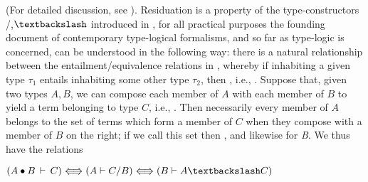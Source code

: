 \documentclass[output=paper,colorlinks,citecolor=brown]{langscibook}
\begin{document}
\begin{exe}
 \ex\label{residuation}
  \sem{ (\psi  \ensuremath{\vdash\xspace } \psi\supset\varrho)\Lleftarrow\!\Rrightarrow (\psi,\phi  \ensuremath{\vdash\xspace } \varrho)\Lleftarrow\!\Rrightarrow (\phi  \ensuremath{\vdash\xspace } \psi\supset\varrho) }
\end{exe}
(For detailed discussion, see \citealt{sep-logic-substructural}). Residuation
is a property of the type-constructors /,$\bsl$ introduced in
\citet{lambek58}, for all practical purposes the founding document of
contemporary type-logical formalisms, and so far as type-logic is
concerned, can be understood in the following way: there is a natural
relationship between the entailment/equivalence relations in
, whereby if inhabiting a given type $\tau_1$ entails
inhabiting some other type $\tau_2$, then \sem{ \tau_1  \ensuremath{\vdash\xspace } \tau_2 },
i.e., \sem{   \ensuremath{\vdash\xspace } \tau_1 \ensuremath{ \rightarrow } \tau_2 }. Suppose that, given two types $A,B$,
we can compose each member of $A$ with each member of $B$ to yield a
term belonging to type $C$, i.e., \sem{ A\bullet B\,  \ensuremath{\vdash\xspace } \,\textit{C}  }. Then
necessarily every member of $A$ belongs to the set of terms which form
a member of $C$ when they compose with a member of $B$ on the right;
if we call this set  then
\sem{ A{}  \ensuremath{\vdash\xspace } B/C}, and likewise for
\textit{B}. We thus have the relations

\begin{exe}
 \ex\label{typeResiduation}
   $ (A \bullet B\,\vdash\, C) \Lleftarrow\!\Rrightarrow (A \vdash C/B)
   \Lleftarrow\!\Rrightarrow (B \vdash A\bsl C)$
\end{exe}

\end{document}
